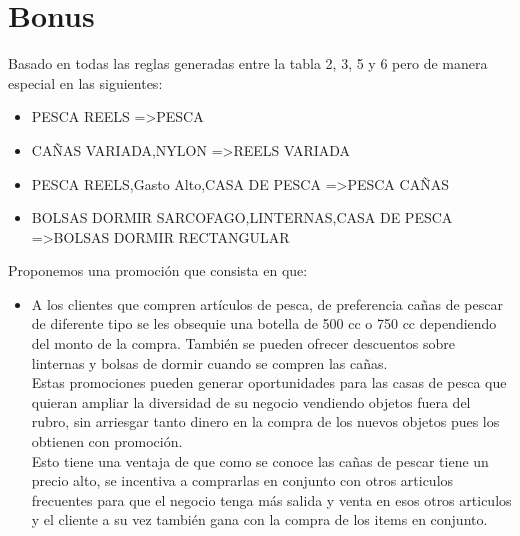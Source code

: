 \documentclass[]{article}
\begin{document}
	\section{Bonus}
	Basado en todas las reglas generadas entre la tabla 2, 3, 5 y 6 pero de manera especial en las siguientes:\\
	\begin{itemize}
		\item PESCA REELS =\textgreater PESCA
		\item CAÑAS VARIADA,NYLON =\textgreater REELS VARIADA
		\item PESCA REELS,Gasto Alto,CASA DE PESCA =\textgreater PESCA CAÑAS
		\item BOLSAS DORMIR SARCOFAGO,LINTERNAS,CASA DE PESCA =\textgreater BOLSAS DORMIR RECTANGULAR
	\end{itemize}
	 Proponemos una promoción que consista en que: 
	\begin{itemize}
		\item A los clientes que compren artículos de pesca, de preferencia cañas de pescar de diferente tipo se les obsequie una botella de 500 cc o 750 cc dependiendo del monto de la compra. También se pueden ofrecer descuentos sobre linternas y bolsas de dormir cuando se compren las cañas.\\
		
		Estas promociones pueden generar oportunidades para las casas de pesca que quieran ampliar la diversidad de su negocio vendiendo objetos fuera del rubro, sin arriesgar tanto dinero en la compra de los nuevos objetos pues los obtienen con promoción.\\
		
		Esto tiene una ventaja de que como se conoce las cañas de pescar tiene un precio alto, se incentiva a comprarlas en conjunto con otros articulos frecuentes para que el negocio tenga más salida y venta en esos otros articulos y el cliente a su vez también gana con la compra de los items en conjunto.\\
	\end{itemize}
\end{document}
